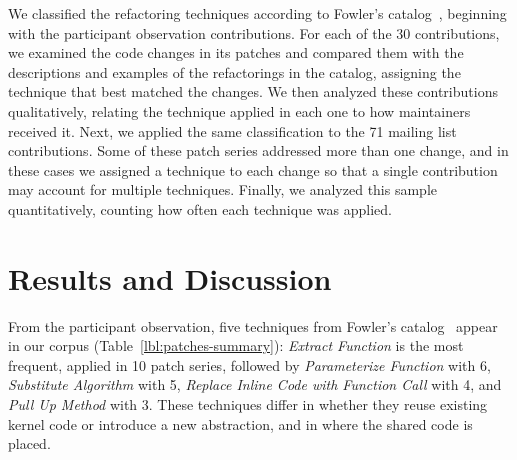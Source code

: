 \documentclass[10pt,conference]{IEEEtran}
\begin{document}
We classified the refactoring techniques according to Fowler's catalog~\cite{fowler2018refactoring}, beginning with the participant observation contributions. For each of the 30 contributions, we examined the code changes in its patches and compared them with the descriptions and examples of the refactorings in the catalog, assigning the technique that best matched the changes.
We then analyzed these contributions qualitatively, relating the technique applied in each one to how maintainers received it. Next, we applied the same classification to the 71 mailing list contributions. Some of these patch series addressed more than one change, and in these cases we assigned a technique to each change so that a single contribution may account for multiple techniques.
Finally, we analyzed this sample quantitatively, counting how often each technique was applied.

\section{Results and Discussion}\label{sec:results-and-discussion}

From the participant observation, five techniques from Fowler's catalog~\cite{fowler2018refactoring} appear in our corpus (Table~\ref{lbl:patches-summary}): \textit{Extract Function} is the most frequent, applied in 10 patch series, followed by \textit{Parameterize Function} with 6, \textit{Substitute Algorithm} with 5, \textit{Replace Inline Code with Function Call} with 4, and \textit{Pull Up Method} with 3. These techniques differ in whether they reuse existing kernel code or introduce a new abstraction, and in where the shared code is placed.
\end{document}
